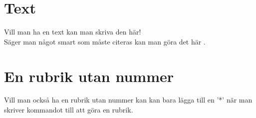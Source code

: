 \documentclass[]{article} %
\newcommand{\HRule}{\rule{\linewidth}{0.5mm}}
\begin{document}
\begin{titlepage}







\end{titlepage}

\newpage
\tableofcontents
\thispagestyle{empty}
\newpage

\setcounter{apge}{}
\section{Text}
Vill man ha en text kan man skriva den här! \\
Säger man något smart som måste citeras kan man göra det här \cite{Absorption}.

\section*{En rubrik utan nummer}
Vill man också ha en rubrik utan nummer kan kan bara lägga till en '*' när man skriver kommandot till att göra en rubrik.
\end{document}
